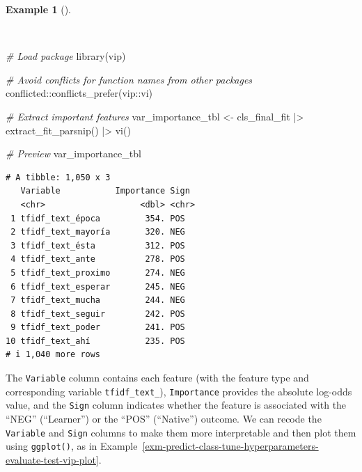 \documentclass[
  letterpaper,
  krantz1]{latex/krantz-mod}
\newenvironment{Shaded}{\begin{snugshade}}{\end{snugshade}}
\newcommand{\CommentTok}[1]{\textcolor[rgb]{0.00,0.00,0.00}{\textit{#1}}}
\newcommand{\FunctionTok}[1]{\textcolor[rgb]{0.00,0.00,0.00}{#1}}
\newcommand{\NormalTok}[1]{\textcolor[rgb]{0.00,0.00,0.00}{#1}}
\newcommand{\OtherTok}[1]{\textcolor[rgb]{0.00,0.00,0.00}{#1}}
\newcommand{\SpecialCharTok}[1]{\textcolor[rgb]{0.00,0.00,0.00}{#1}}
\theoremstyle{definition}
\newtheorem{example}{Example}[chapter]
\theoremstyle{definition}
\theoremstyle{remark}
\begin{document}
\begin{example}[]\protect\hypertarget{exm-predict-class-tune-hyperparameters-evaluate-test-vip}{}\label{exm-predict-class-tune-hyperparameters-evaluate-test-vip}

~

\begin{Shaded}
\begin{Highlighting}[numbers=left,,]
\CommentTok{\# Load package}
\FunctionTok{library}\NormalTok{(vip)}

\CommentTok{\# Avoid conflicts for function names from other packages}
\NormalTok{conflicted}\SpecialCharTok{::}\FunctionTok{conflicts\_prefer}\NormalTok{(vip}\SpecialCharTok{::}\NormalTok{vi)}

\CommentTok{\# Extract important features}
\NormalTok{var\_importance\_tbl }\OtherTok{\textless{}{-}}
\NormalTok{  cls\_final\_fit }\SpecialCharTok{|\textgreater{}}
  \FunctionTok{extract\_fit\_parsnip}\NormalTok{() }\SpecialCharTok{|\textgreater{}}
  \FunctionTok{vi}\NormalTok{()}

\CommentTok{\# Preview}
\NormalTok{var\_importance\_tbl}
\end{Highlighting}
\end{Shaded}

\begin{verbatim}
# A tibble: 1,050 x 3
   Variable           Importance Sign 
   <chr>                   <dbl> <chr>
 1 tfidf_text_época         354. POS  
 2 tfidf_text_mayoría       320. NEG  
 3 tfidf_text_ésta          312. POS  
 4 tfidf_text_ante          278. POS  
 5 tfidf_text_proximo       274. NEG  
 6 tfidf_text_esperar       245. NEG  
 7 tfidf_text_mucha         244. NEG  
 8 tfidf_text_seguir        242. POS  
 9 tfidf_text_poder         241. POS  
10 tfidf_text_ahí           235. POS  
# i 1,040 more rows
\end{verbatim}

\end{example}

The \texttt{Variable} column contains each feature (with the feature
type and corresponding variable \texttt{tfidf\_text\_}),
\texttt{Importance} provides the absolute log-odds value, and the
\texttt{Sign} column indicates whether the feature is associated with
the ``NEG'' (``Learner'') or the ``POS'' (``Native'') outcome. We can
recode the \texttt{Variable} and \texttt{Sign} columns to make them more
interpretable and then plot them using \texttt{ggplot()}, as in
Example~\ref{exm-predict-class-tune-hyperparameters-evaluate-test-vip-plot}.
\end{document}
